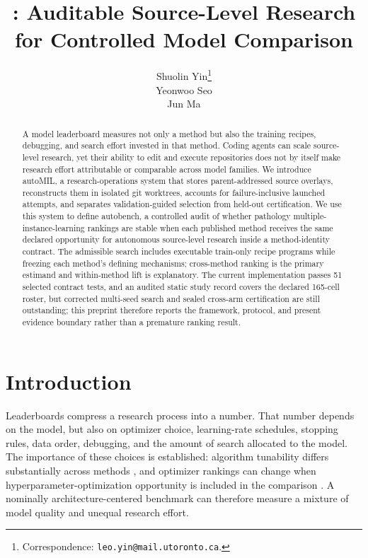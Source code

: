 \documentclass{article}
\title{\ours: Auditable Source-Level Research for Controlled Model Comparison}
\author{%
  Shuolin Yin\thanks{Correspondence: \texttt{leo.yin@mail.utoronto.ca}. %
  \pendinginline{P-AUTH-1}{confirm final author list, order, and affiliations
  before public release.}}\\
  \And
  Yeonwoo Seo\\
  \And
  Jun Ma
}
\newcommand{\ours}{\textsf{autoMIL}\xspace}
\newcommand{\autobench}{\textsf{autobench}\xspace}
\begin{document}
\maketitle

\begin{abstract}
A model leaderboard measures not only a method but also the training recipes,
debugging, and search effort invested in that method.
Coding agents can scale source-level research, yet their ability to edit and
execute repositories does not by itself make research effort attributable or
comparable across model families.
We introduce \ours, a research-operations system that stores parent-addressed
source overlays, reconstructs them in isolated git worktrees, accounts for
failure-inclusive launched attempts, and separates validation-guided selection
from held-out certification.
We use this system to define \autobench, a controlled audit of whether
pathology multiple-instance-learning rankings are stable when each published
method receives the same declared opportunity for autonomous source-level
research inside a method-identity contract.  The admissible search includes
executable train-only recipe programs while freezing each method's defining
mechanisms; cross-method ranking is the primary estimand and within-method lift
is explanatory.
The current implementation passes 51 selected contract tests, and an audited
static study record covers the declared 165-cell roster, but corrected
multi-seed search and sealed cross-arm certification are still outstanding;
this preprint therefore reports the framework, protocol, and present evidence
boundary rather than a premature ranking result.
\end{abstract}

\section{Introduction}

Leaderboards compress a research process into a number.  That number depends
on the model, but also on optimizer choice, learning-rate schedules, stopping
rules, data order, debugging, and the amount of search allocated to the model.
The importance of these choices is established: algorithm tunability differs
substantially across methods \cite{probst2019tunability}, and optimizer rankings
can change when hyperparameter-optimization opportunity is included in the
comparison \cite{schmidt2020optimizer}.  A nominally architecture-centered
benchmark can therefore measure a mixture of model quality and unequal research
effort.
\end{document}

